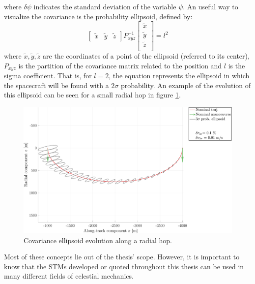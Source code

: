 	\noindent where $\delta \psi$ indicates the standard deviation of the variable $\psi$. An useful way to visualize the covariance is the probability ellipsoid, defined by:
	\[
	\left[\begin{array}{ccc}
	\tilde{x} & \tilde{y} & \tilde{z}
	\end{array} \right] 
	P_{xyz}^{-1} 
	\left[ \begin{array}{c}
	\tilde{x} \\ \tilde{y} \\ \tilde{z} \\
	\end{array} \right] = l^2
	\]
	\noindent where $\tilde{x}, \tilde{y}, \tilde{z}$ are the coordinates of a point of the ellipsoid (referred to its center), $P_{xyz}$ is the partition of the covariance matrix related to the position and $l$ is the sigma coefficient. That is, for $l = 2$, the equation represents the ellipsoid in which the spacecraft will be found with a $2\sigma$ probability. An example of the evolution of this ellipsoid can be seen for a small radial hop in figure \ref{figCh1:Covariance_segment}. 
	\begin{figure}[!htb]
	\centering\includegraphics[width = 0.90\linewidth]{Chapters/Chapter_01/Covariance_segment}
	\caption{Covariance ellipsoid evolution along a radial hop.}
	\label{figCh1:Covariance_segment}
	\end{figure}
	\FloatBarrier
	\indent Most of these concepts lie out of the thesis' scope. However, it is important to know that the STMs developed or quoted throughout this thesis can be used in many different fields of celestial mechanics.
